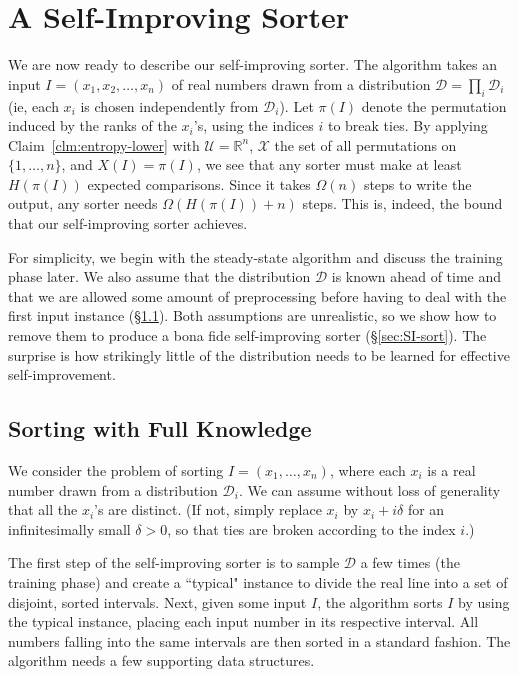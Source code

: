 \documentclass{siamltex}
\newcommand{\D}{\mathcal{D}}
\newcommand{\cU}{\mathcal{U}}
\newcommand{\cX}{\mathcal{X}}
\newcommand{\R}{\mathbb R}
\begin{document}
\section{A Self-Improving Sorter}\label{sec:sorter}

We are now ready to describe our self-improving sorter. 
The algorithm takes an 
input $I = (x_1, x_2, \ldots, x_n)$ of real numbers drawn from
a distribution $\D = \prod_i \D_i$ (ie, each $x_i$ is chosen
independently from $\D_i$).
Let $\pi(I)$ denote the permutation induced by the ranks of the $x_i$'s,
using the indices $i$ to break ties.
By applying Claim~\ref{clm:entropy-lower} with $\cU = \R^n$, $\cX$
the set of all permutations on $\{1, \ldots, n\}$, and
$X(I) = \pi(I)$,  we see 
that any sorter must make at least $H(\pi(I))$ 
expected comparisons. Since it takes $\Omega(n)$ steps to
write the output, any sorter needs $\Omega(H(\pi(I)) + n)$ steps.
This is, indeed, the bound that our self-improving sorter achieves.

For simplicity, we begin with the steady-state algorithm
and discuss the training phase later.
We also assume that the distribution $\D$
is known ahead of time and that we are allowed some amount of preprocessing
before having to deal with the first input instance 
(\S\ref{sec:preprocessing-sort}).
Both assumptions are unrealistic, so we show how to remove them
to produce a bona fide self-improving sorter (\S \ref{sec:SI-sort}).
The surprise is how strikingly little of the distribution needs to be learned
for effective self-improvement.

\subsection{Sorting with Full Knowledge}\label{sec:preprocessing-sort}

We consider the problem of sorting $I= (x_1,\ldots,x_n)$, where each $x_i$ is
a real number drawn from a distribution $\D_i$. 
We can assume without loss of generality that all the $x_i$'s
are distinct. (If not, simply replace $x_i$ by $x_i +i\delta$ for 
an infinitesimally small $\delta > 0$, so that ties are broken according
to the index $i$.)

The first step of the self-improving sorter is to sample $\D$ a few times
(the training phase) and create a ``typical" instance to divide the real line
into a set of disjoint, sorted intervals.  Next, given some input $I$, the
algorithm sorts $I$ by using the typical instance, placing each input number in
its respective interval. All numbers falling into the same intervals are then
sorted in a standard fashion. The algorithm needs a few supporting data
structures.
\end{document}
